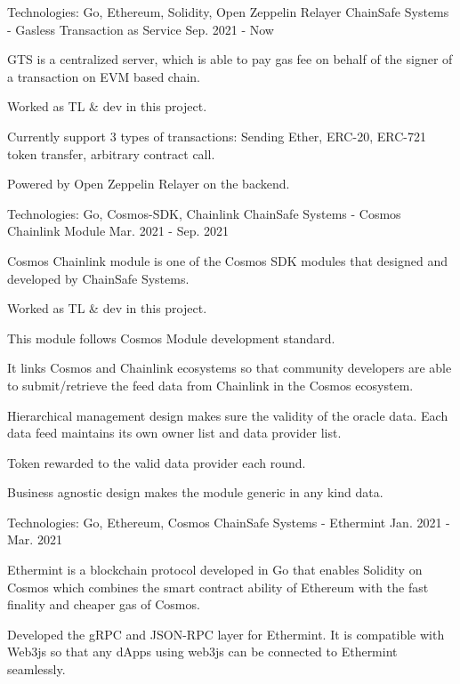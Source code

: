 \begin{cventries}
\cventry
    {Technologies: \quad Go, Ethereum, Solidity, Open Zeppelin Relayer}
    {ChainSafe Systems - Gasless Transaction as Service}
    {}
    {Sep. 2021 - Now}
    {
      \begin{cvitems}
        \item {GTS is a centralized server, which is able to pay gas fee on behalf of the signer of a transaction on EVM based chain.}
        \item {Worked as TL \& dev in this project.}
        \item {Currently support 3 types of transactions: Sending Ether, ERC-20, ERC-721 token transfer, arbitrary contract call.}
        \item {Powered by Open Zeppelin Relayer on the backend.}
      \end{cvitems}
    }

\cventry
    {Technologies: \quad Go, Cosmos-SDK, Chainlink}
    {ChainSafe Systems - Cosmos Chainlink Module}
    {}
    {Mar. 2021 - Sep. 2021}
    {
      \begin{cvitems}
        \item {Cosmos Chainlink module is one of the Cosmos SDK modules that designed and developed by ChainSafe Systems.}
        \item {Worked as TL \& dev in this project.}
        \item {This module follows Cosmos Module development standard.}
        \item {It links Cosmos and Chainlink ecosystems so that community developers are able to submit/retrieve the feed data from Chainlink in the Cosmos ecosystem.}
        \item {Hierarchical management design makes sure the validity of the oracle data. Each data feed maintains its own owner list and data provider list.}
        \item {Token rewarded to the valid data provider each round.}
        \item {Business agnostic design makes the module generic in any kind data.}
      \end{cvitems}
    }
    
\cventry
    {Technologies: \quad Go, Ethereum, Cosmos}
    {ChainSafe Systems - Ethermint}
    {}
    {Jan. 2021 - Mar. 2021}
    {
      \begin{cvitems}
        \item {Ethermint is a blockchain protocol developed in Go that enables Solidity on Cosmos which combines the smart contract ability of Ethereum with the fast finality and cheaper gas of Cosmos.}
        \item {Developed the gRPC and JSON-RPC layer for Ethermint. It is compatible with Web3js so that any dApps using web3js can be connected to Ethermint seamlessly.}
      \end{cvitems}
    }
    

\end{cventries}
